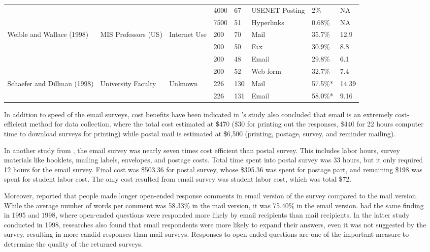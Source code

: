 \begin{center}
\begin{longtable}{ | p{2cm} | p{2cm} | p{2cm} | p{0.75cm} | p{0.75cm} | p{1cm} | p{1cm} | p{0.5cm} | }
	&  &  & 4000 & 67 & USENET Posting & 2\% & NA \\ \cline{4-8}
	&  &  & 7500 & 51 & Hyperlinks & 0.68\% & NA \\ \hline 
    \multirow{4}{2cm}{Weible and Wallace (1998)} & \multirow{4}{2cm}{MIS Professors (US)} & \multirow{4}{2cm}{Internet Use} & 200 & 70 & Mail & 35.7\% & 12.9 \\ \cline{4-8}
	&  &  & 200 & 50 & Fax & 30.9\% & 8.8 \\ \cline{4-8}
	&  &  & 200 & 48 & Email & 29.8\% & 6.1 \\ \cline{4-8}
	&  &  & 200 & 52 & Web form & 32.7\% & 7.4 \\ \hline
    \multirow{2}{2cm}{Schaefer and Dillman (1998)} & \multirow{2}{2cm}{University Faculty} & \multirow{2}{2cm}{Unknown} & 226 & 130 & Mail & 57.5\%* & 14.39 \\ \cline{4-8}
	&  &  & 226 & 131 & Email & 58.0\%* & 9.16 \\ \hline
    \end{longtable}
\end{center}


In addition to speed of the email surveys, cost benefits have been indicated in \citeauthor{Sheehan2006}'s \citeyearpar{Sheehan2006} study also concluded that email is an extremely cost-efficient method for data collection, where the total cost estimated at \$470 (\$30 for printing out the responses, \$440 for 22 hours computer time to download surveys for printing) while postal mail is estimated at \$6,500 (printing, postage, survey, and reminder mailing).
\vspace{1cm}

In another study from \cite{Mavis1998}, the email survey was nearly seven times cost efficient than postal survey. This includes labor hours, survey materials like booklets, mailing labels, envelopes, and postage costs. Total time spent into postal survey was 33 hours, but it only required 12 hours for the email survey. Final cost was \$503.36 for postal survey, whose \$305.36 was spent for postage part, and remaining \$198 was spent for student labor cost. The only cost resulted from email survey was student labor cost, which was total \$72.
\vspace{1cm}

Moreover, \cite{Paolo2009} reported that people made longer open-ended response comments in email version of the survey compared to the mail version. While the average number of words per comment was 58.33\% in the mail version, it was 75.40\% in the email version. \cite{BachmannD.ElfrinkJ.&Vazzana1999} had the same finding in 1995 and 1998, where open-ended questions were responded more likely by email recipients than mail recipients. In the latter study conducted in 1998, researches also found that email respondents were more likely to expand their answers, even it was not suggested by the survey, resulting in more candid responses than mail surveys. Responses to open-ended questions are one of the important measure to determine the quality of the returned surveys.
\vspace{1cm}

